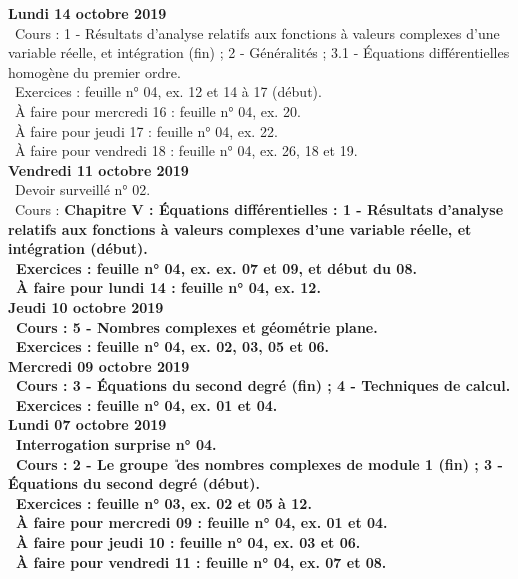 \documentclass[12pt,a4paper]{article}
\begin{document}
\noindent\textbf{Lundi 14 octobre 2019}\\
\bu\ Cours : 1 - Résultats d'analyse relatifs aux fonctions à valeurs complexes d'une variable réelle, et 
intégration (fin) ; 2 - Généralités ; 3.1 - Équations différentielles homogène du premier ordre.\\
\bu\ Exercices : feuille n° 04, ex. 12 et 14 à 17 (début).\\
\bu\ À faire pour mercredi 16 : feuille n° 04, ex. 20.\\
\bu\ À faire pour jeudi 17 : feuille n° 04, ex. 22.\\
\bu\ À faire pour vendredi 18 : feuille n° 04, ex. 26, 18 et 19.\vspace{.4cm}\\
  
\noindent\textbf{Vendredi 11 octobre 2019}\\
\bu\ Devoir surveillé n° 02.\\
 \bu\ Cours : \bf Chapitre V \rm : Équations différentielles : 1 - Résultats d'analyse relatifs aux fonctions à 
valeurs complexes d'une variable réelle, et intégration (début).\\
 \bu\ Exercices : feuille n° 04, ex. ex. 07 et 09, et début du 08.\\
 \bu\ À faire pour lundi 14 : feuille n° 04, ex. 12.\vspace{.4cm}\\
  
 \noindent\textbf{Jeudi 10 octobre 2019}\\
 \bu\ Cours : 5 - Nombres complexes et géométrie plane.\\
 \bu\ Exercices : feuille n° 04, ex. 02, 03, 05 et 06.\vspace{.4cm}\\
  
\noindent\textbf{\bf Mercredi 09 octobre 2019}\\
\bu\ Cours : 3 - Équations du second degré (fin) ; 4 - Techniques de calcul.\\
 \bu\ Exercices : feuille n° 04, ex. 01 et 04.\vspace{.4cm}\\

\noindent\textbf{\bf Lundi 07 octobre 2019}\\
\bu\ Interrogation surprise n° 04.\\ 
\bu\ Cours : 2 - Le groupe \U\ des nombres complexes de module 1 (fin) ; 3 - Équations du second 
degré (début).\\
\bu\ Exercices : feuille n° 03, ex. 02 et 05 à 12.\\
\bu\ À faire pour mercredi 09 : feuille n° 04, ex. 01 et 04.\\
\bu\ À faire pour jeudi 10 : feuille n° 04, ex. 03 et 06.\\
\bu\ À faire pour vendredi 11 : feuille n° 04, ex. 07 et 08.\vspace{.4cm}\\
\end{document}
